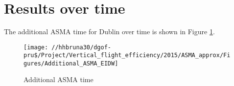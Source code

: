 \documentclass[]{article}
\begin{document}
\newpage

\section{Results over time}\label{results-over-time}

The additional ASMA time for Dublin over time is shown in Figure
\ref{fig:ASMAtime}.

\begin{figure}

{\centering \texttt{[image: //hhbruna30/dgof-pru\$/Project/Vertical\_flight\_efficiency/2015/ASMA\_approx/Figures/Additional\_ASMA\_EIDW]} 

}

\caption{Additional ASMA time}\label{fig:ASMAtime}
\end{figure}
\end{document}
